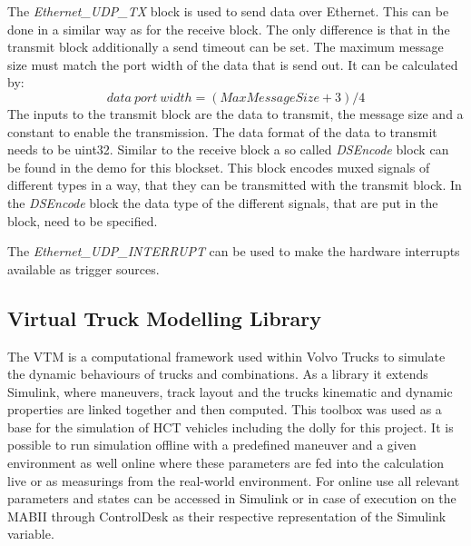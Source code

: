 \documentclass[ExampleMasters.tex]{subfiles}
\begin{document}
The \textit{Ethernet\_UDP\_TX} block is used to send data over Ethernet. This can be done in a similar way as for the receive block. The only difference is that in the transmit block additionally a send timeout can be set. The maximum message size must match the port width of the data that is send out. It can be calculated by:
\begin{equation}
data\ port\ width=(MaxMessageSize + 3) / 4
\end{equation}
The inputs to the transmit block are the data to transmit, the message size and a constant to enable the transmission. The data format of the data to transmit needs to be uint32. Similar to the receive block a so called \textit{DSEncode} block can be found in the demo for this blockset. This block encodes muxed signals of different types in a way, that they can be transmitted with the transmit block. In the \textit{DSEncode} block the data type of the different signals, that are put in the block, need to be specified.

The \textit{Ethernet\_UDP\_INTERRUPT} can be used to make the hardware interrupts available as trigger sources.
\subsection{Virtual Truck Modelling Library}
\label{sec:VTM}
The \gls{VTM} is a computational framework used within Volvo Trucks to simulate the dynamic behaviours of trucks and combinations. As a library it extends Simulink, where maneuvers, track layout and the trucks kinematic and dynamic properties are linked together and then computed. This toolbox was used as a base for the simulation of \gls{HCT} vehicles including the dolly for this project. It is possible to run simulation offline with a predefined maneuver and a given environment as well online where these parameters are fed into the calculation live or as measurings from the real-world environment. For online use all relevant parameters and states can be accessed in Simulink or in case of execution on the \gls{MABII} through ControlDesk as their respective representation of the Simulink variable. 


	
\end{document}
